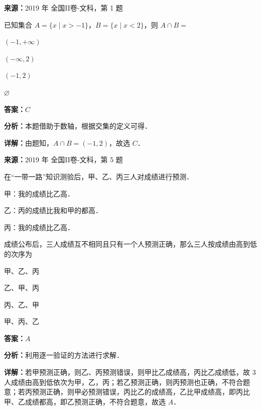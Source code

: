 \begin{question}[points=5]
\textbf{来源：}2019 年 全国II卷-文科，第 1 题\par
已知集合 $A=\{x\mid x>-1\}$，$B=\{x\mid x<2\}$，则 $A\cap B=$
\begin{choices}
  \item $(-1,+\infty)$
  \item $(-\infty,2)$
  \item $(-1,2)$
  \item $\varnothing$
\end{choices}
\begin{solution}
\textbf{答案：}$C$

\textbf{分析：}本题借助于数轴，根据交集的定义可得．

\textbf{详解：}由题知，$A\cap B=(-1,2)$，故选 $C$．
\end{solution}
\end{question}

\begin{question}[points=5]
\textbf{来源：}2019 年 全国II卷-文科，第 5 题\par
在“一带一路”知识测验后，甲、乙、丙三人对成绩进行预测．

甲：我的成绩比乙高．

乙：丙的成绩比我和甲的都高．

丙：我的成绩比乙高．

成绩公布后，三人成绩互不相同且只有一个人预测正确，那么三人按成绩由高到低的次序为
\begin{choices}
  \item 甲、乙、丙
  \item 乙、甲、丙
  \item 丙、乙、甲
  \item 甲、丙、乙
\end{choices}
\begin{solution}
\textbf{答案：}$A$

\textbf{分析：}利用逐一验证的方法进行求解．

\textbf{详解：}若甲预测正确，则乙、丙预测错误，则甲比乙成绩高，丙比乙成绩低，故 $3$ 人成绩由高到低依次为甲，乙，丙；若乙预测正确，则丙预测也正确，不符合题意；若丙预测正确，则甲必预测错误，丙比乙的成绩高，乙比甲成绩高，即丙比甲、乙成绩都高，即乙预测正确，不符合题意，故选 $A$．
\end{solution}
\end{question}

